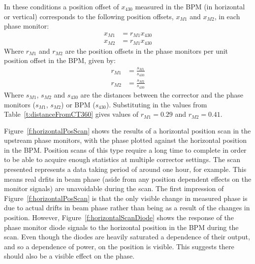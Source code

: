 In these conditions a position offset of \(x_{430}\) measured in the BPM (in horizontal or vertical) corresponds to the following position offsets, \(x_{M1}\) and \(x_{M2}\), in each phase monitor:
\begin{align}
x_{M1} &= r_{M1}x_{430} \\
x_{M2} &= r_{M1}x_{430}
\end{align}
Where \(r_{M1}\) and \(r_{M2}\) are the position offsets in the phase monitors per unit position offset in the BPM, given by:
\begin{align}
r_{M1} &= \frac{s_{M1}}{s_{430}} \\
r_{M2} &= \frac{s_{M2}}{s_{430}}
\end{align}
Where \(s_{M1}\), \(s_{M2}\) and \(s_{430}\) are the distances between the corrector and the phase monitors (\(s_{M1}\), \(s_{M2}\)) or BPM (\(s_{430}\)). Substituting in the values from Table~\ref{t:distanceFromCT360} gives values of \(r_{M1} = 0.29\) and \(r_{M2} = 0.41\).

Figure~\ref{f:horizontalPosScan} shows the results of a horizontal position scan in the upstream phase monitors, with the phase plotted against the horizontal position in the BPM. Position scans of this type require a long time to complete in order to be able to acquire enough statistics at multiple corrector settings. The scan presented represents a data taking period of around one hour, for example. This means real drfits in beam phase (aside from any position dependent effects on the monitor signals) are unavoidable during the scan. The first impression of Figure~\ref{f:horizontalPosScan} is that the only visible change in measured phase is due to actual drifts in beam phase rather than being as a result of the changes in position. However, Figure~\ref{f:horizontalScanDiode} shows the response of the phase monitor diode signals to the horizontal position in the BPM during the scan. Even though the diodes are heavily saturated a dependence of their output, and so a dependence of power, on the position is visible. This suggests there should also be a visible effect on the phase.

